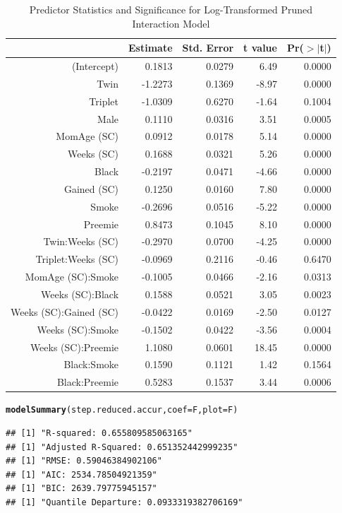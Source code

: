 \documentclass{article}\usepackage[]{graphicx}\usepackage[]{xcolor}
\makeatletter
\newcommand{\hlstd}[1]{\textcolor[rgb]{0.345,0.345,0.345}{#1}}%
\newcommand{\hlkwc}[1]{\textcolor[rgb]{0.333,0.667,0.333}{#1}}%
\newcommand{\hlkwd}[1]{\textcolor[rgb]{0.737,0.353,0.396}{\textbf{#1}}}%
\newenvironment{kframe}{%
 \def\at@end@of@kframe{}%
 \ifinner\ifhmode%
  \def\at@end@of@kframe{\end{minipage}}%
  \begin{minipage}{\columnwidth}%
 \fi\fi%
 \def\FrameCommand##1{\hskip\@totalleftmargin \hskip-\fboxsep
 \colorbox{shadecolor}{##1}\hskip-\fboxsep
     \hskip-\linewidth \hskip-\@totalleftmargin \hskip\columnwidth}%
 \MakeFramed {\advance\hsize-\width
   \@totalleftmargin\z@ \linewidth\hsize
   \@setminipage}}%
 {\par\unskip\endMakeFramed%
 \at@end@of@kframe}
\newenvironment{knitrout}{}{} %
\makeatother
\begin{document}
\begin{table}[H]
\centering
\begin{tabular}{rrrrr}
  \hline
 & Estimate & Std. Error & t value & Pr($>$$|$t$|$) \\ 
  \hline
(Intercept) & 0.1813 & 0.0279 & 6.49 & 0.0000 \\ 
  Twin & -1.2273 & 0.1369 & -8.97 & 0.0000 \\ 
  Triplet & -1.0309 & 0.6270 & -1.64 & 0.1004 \\ 
  Male & 0.1110 & 0.0316 & 3.51 & 0.0005 \\ 
  MomAge (SC) & 0.0912 & 0.0178 & 5.14 & 0.0000 \\ 
  Weeks (SC) & 0.1688 & 0.0321 & 5.26 & 0.0000 \\ 
  Black & -0.2197 & 0.0471 & -4.66 & 0.0000 \\ 
  Gained (SC) & 0.1250 & 0.0160 & 7.80 & 0.0000 \\ 
  Smoke & -0.2696 & 0.0516 & -5.22 & 0.0000 \\ 
  Preemie & 0.8473 & 0.1045 & 8.10 & 0.0000 \\ 
  Twin:Weeks (SC) & -0.2970 & 0.0700 & -4.25 & 0.0000 \\ 
  Triplet:Weeks (SC) & -0.0969 & 0.2116 & -0.46 & 0.6470 \\ 
  MomAge (SC):Smoke & -0.1005 & 0.0466 & -2.16 & 0.0313 \\ 
  Weeks (SC):Black & 0.1588 & 0.0521 & 3.05 & 0.0023 \\ 
  Weeks (SC):Gained (SC) & -0.0422 & 0.0169 & -2.50 & 0.0127 \\ 
  Weeks (SC):Smoke & -0.1502 & 0.0422 & -3.56 & 0.0004 \\ 
  Weeks (SC):Preemie & 1.1080 & 0.0601 & 18.45 & 0.0000 \\ 
  Black:Smoke & 0.1590 & 0.1121 & 1.42 & 0.1564 \\ 
  Black:Preemie & 0.5283 & 0.1537 & 3.44 & 0.0006 \\ 
   \hline
\end{tabular}
\caption{Predictor Statistics and Significance for Log-Transformed Pruned Interaction Model} 
\label{interact.model.log.prune}
\end{table}
\begin{knitrout}
\color{fgcolor}\begin{kframe}
\begin{alltt}
\hlkwd{modelSummary}\hlstd{(step.reduced.accur,} \hlkwc{coef}\hlstd{=F,} \hlkwc{plot}\hlstd{=F)}
\end{alltt}
\begin{verbatim}
## [1] "R-squared: 0.655809585063165"
## [1] "Adjusted R-Squared: 0.651352442999235"
## [1] "RMSE: 0.59046384902106"
## [1] "AIC: 2534.78504921359"
## [1] "BIC: 2639.79775945157"
## [1] "Quantile Departure: 0.0933319382706169"
\end{verbatim}
\end{kframe}
\end{knitrout}
\end{document}
